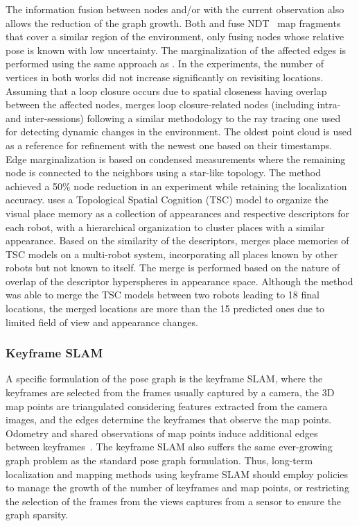 The information fusion between nodes and/or with the current observation also allows the reduction of the graph growth.
Both \cite{einhorn-gross:2013:6698849} and \cite{einhorn-gross:2015:008} fuse NDT~\parencite{original:ndt} map fragments that cover a similar region of the environment, only fusing nodes whose relative pose is known with low uncertainty. The marginalization of the affected edges is performed using the same approach as \cite{kretzschmar-et-al:2010:2}. In the experiments, the number of vertices in both works did not increase significantly on revisiting locations.
Assuming that a loop closure occurs due to spatial closeness having overlap between the affected nodes, \cite{lázaro-et-al:2018:8594310} merges loop closure-related nodes (including intra- and inter-sessions) following a similar methodology to the ray tracing one used for detecting dynamic changes in the environment. The oldest point cloud is used as a reference for refinement with the newest one based on their timestamps. Edge marginalization is based on condensed measurements where the remaining node is connected to the neighbors using a star-like topology. The method achieved a 50\% node reduction in an experiment while retaining the localization accuracy.
\cite{karaoguz-bozma:2020:2} uses a Topological Spatial Cognition (TSC) model to organize the visual place memory as a collection of appearances and respective descriptors for each robot, with a hierarchical organization to cluster places with a similar appearance. Based on the similarity of the descriptors, \cite{karaoguz-bozma:2020:2} merges place memories of TSC models on a multi-robot system, incorporating all places known by other robots but not known to itself. The merge is performed based on the nature of overlap of the descriptor hyperspheres in appearance space. Although the method was able to merge the TSC models between two robots leading to 18 final locations, the merged locations are more than the 15 predicted ones due to limited field of view and appearance changes.



\subsubsection{Keyframe SLAM}

A specific formulation of the pose graph is the keyframe SLAM, where the keyframes are selected from the frames usually captured by a camera, the 3D map points are triangulated considering features extracted from the camera images, and the edges determine the keyframes that observe the map points. Odometry and shared observations of map points induce additional edges between keyframes~\parencite{schmuck-chli:2019:00071}.
The keyframe SLAM also suffers the same ever-growing graph problem as the standard pose graph formulation. Thus, long-term localization and mapping methods using keyframe SLAM should employ policies to manage the growth of the number of keyframes and map points, or restricting the selection of the frames from the views captures from a sensor to ensure the graph sparsity.



